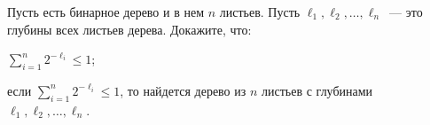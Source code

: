 Пусть есть бинарное дерево и в нем $n$ листьев. Пусть $\ell_1, \ell_2, \dots, \ell_n$~--- это глубины
всех листьев дерева. Докажите, что:
\begin{enumcyr}
    \item $\sum\limits_{i = 1}^n 2^{-\ell_i} \le 1$;
    \item если $\sum\limits_{i = 1}^n 2^{-\ell_i} \le 1$, то найдется дерево из $n$ листьев с глубинами
        $\ell_1, \ell_2, \dots, \ell_n$.
\end{enumcyr}